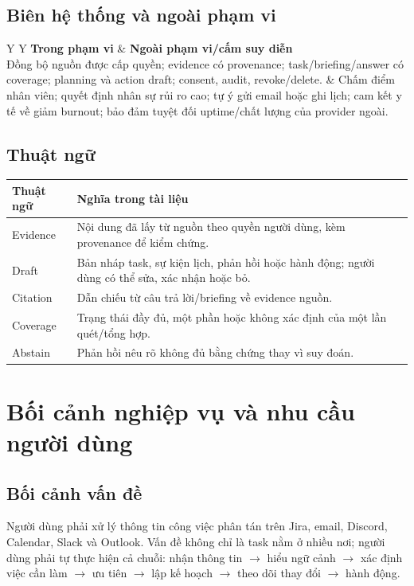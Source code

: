 \documentclass[12pt,a4paper]{article}
\begin{document}
\subsection{Biên hệ thống và ngoài phạm vi}
\begin{table}[H]
\centering
\caption{Biên trách nhiệm của phiên bản yêu cầu 1.0}
\begin{tabularx}{\textwidth}{Y Y}
\textbf{Trong phạm vi} & \textbf{Ngoài phạm vi/cấm suy diễn}\\
\toprule
Đồng bộ nguồn được cấp quyền; evidence có provenance; task/briefing/answer có
coverage; planning và action draft; consent, audit, revoke/delete. & Chấm điểm
nhân viên; quyết định nhân sự rủi ro cao; tự ý gửi email hoặc ghi lịch; cam kết y
tế về giảm burnout; bảo đảm tuyệt đối uptime/chất lượng của provider ngoài.\\
\bottomrule
\end{tabularx}
\end{table}

\subsection{Thuật ngữ}
\begin{longtable}{p{3cm}p{11cm}}
\toprule Thuật ngữ & Nghĩa trong tài liệu \\ \midrule\endhead
Evidence & Nội dung đã lấy từ nguồn theo quyền người dùng, kèm provenance để kiểm chứng. \\
Draft & Bản nháp task, sự kiện lịch, phản hồi hoặc hành động; người dùng có thể sửa, xác nhận hoặc bỏ. \\
Citation & Dẫn chiếu từ câu trả lời/briefing về evidence nguồn. \\
Coverage & Trạng thái đầy đủ, một phần hoặc không xác định của một lần quét/tổng hợp. \\
Abstain & Phản hồi nêu rõ không đủ bằng chứng thay vì suy đoán. \\
\bottomrule
\end{longtable}

\section{Bối cảnh nghiệp vụ và nhu cầu người dùng}
\subsection{Bối cảnh vấn đề}
Người dùng phải xử lý thông tin công việc phân tán trên Jira, email, Discord,
Calendar, Slack và Outlook. Vấn đề không chỉ là task nằm ở nhiều nơi; người dùng
phải tự thực hiện cả chuỗi: nhận thông tin $\rightarrow$ hiểu ngữ cảnh
$\rightarrow$ xác định việc cần làm $\rightarrow$ ưu tiên $\rightarrow$ lập kế
hoạch $\rightarrow$ theo dõi thay đổi $\rightarrow$ hành động.
\end{document}
